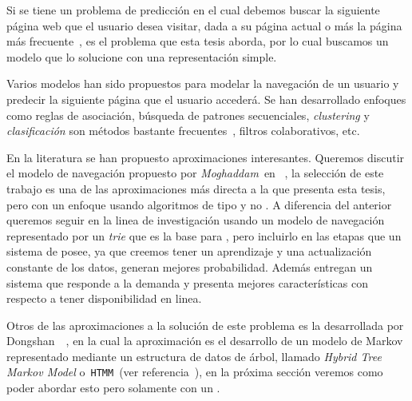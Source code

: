 

Si se tiene un problema de predicción en el cual debemos buscar la siguiente página web que el usuario desea visitar, dada a su página actual o más la página más frecuente~\cite{Poornalatha2012}, es el problema que esta tesis aborda, por lo cual buscamos un modelo que lo solucione con una representación simple.


Varios modelos han sido propuestos para modelar la navegación de un usuario y predecir la siguiente página que el usuario accederá. Se han desarrollado enfoques como  reglas de asociación, búsqueda de patrones secuenciales, \emph{clustering} y \emph{clasificación} son métodos bastante frecuentes~\cite{Moghaddam2009}, filtros colaborativos, etc.


En la literatura se han propuesto aproximaciones interesantes. Queremos discutir el modelo de navegación propuesto por \emph{Moghaddam}~\etal en ~\cite{Moghaddam2009}, la selección de este trabajo es una de las aproximaciones más directa a la que presenta esta tesis, pero con un enfoque usando algoritmos de tipo \losslessdatacompression y no \machinelearning. A  diferencia del anterior queremos seguir en la linea de investigación usando un modelo de navegación representado por un \emph{trie} que es la base para \lzSieteOcho, pero incluirlo en las etapas que un sistema de \machinelearning posee, ya que creemos tener un aprendizaje  y una actualización constante de los datos, generan mejores  probabilidad. Además entregan un sistema que responde a la demanda y presenta mejores características con respecto a tener disponibilidad en linea.

Otros de las aproximaciones a la solución de este problema es la desarrollada por {Dongshan}~\etal~\cite{Dongshan2002}, en la cual la aproximación es el desarrollo de un modelo de Markov representado mediante un estructura de datos de árbol, llamado \emph{Hybrid Tree Markov Model} o~\texttt{HTMM}~(ver referencia~\cite{Dongshan2002}), en la próxima sección veremos como poder abordar esto pero solamente con un \trie.
\uncm
 

 



